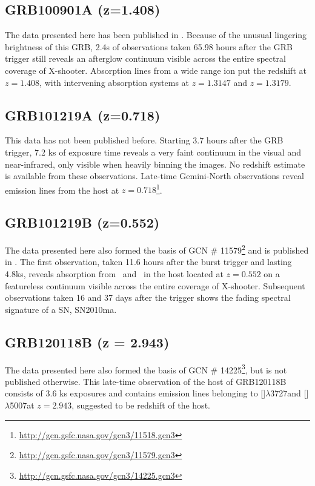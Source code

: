 \documentclass[iop, twocolappendix, numberedappendix, tighten, appendixfloats]{emulateapj}
\newcommand{\oii}{[\ion{O}{2}]$\lambda$3727}
\newcommand{\oiii}{[\ion{O}{3}]$\lambda$5007}
\newcommand{\mgi}{\ion{Mg}{1}}
\newcommand{\mgii}{\ion{Mg}{2}}
\begin{document}
	\subsection{GRB100901A (z=1.408)}
	The data presented here has been published in \citet{Hartoog2013}. Because of
	the unusual lingering brightness of this GRB, 2.4s of observations taken 65.98
	hours after the GRB trigger still reveals an afterglow continuum visible across
	the entire spectral coverage of X-shooter. Absorption lines from a wide range
	ion put the redshift at $z=1.408$, with intervening absorption systems at $z =
	1.3147$ and $z = 1.3179$.

	\subsection{GRB101219A (z=0.718)}
	This data has not been published before. Starting 3.7 hours after the GRB
	trigger, 7.2 ks of exposure time reveals a very faint continuum in the visual
	and near-infrared, only visible when heavily binning the images. No redshift
	estimate is available from these observations.  Late-time Gemini-North
	observations reveal emission lines from the host at
	$z=0.718$\footnote{\url{http://gcn.gsfc.nasa.gov/gcn3/11518.gcn3}}.

	\subsection{GRB101219B (z=0.552)}
	The data presented here also formed the basis of GCN \#
	11579\footnote{\url{http://gcn.gsfc.nasa.gov/gcn3/11579.gcn3}} and is published
	in \citet{Sparre2011}.	The first observation, taken 11.6 hours after the burst
	trigger and lasting 4.8ks, reveals absorption from \mgii~and \mgi~in the host
	located at $z = 0.552$ on a featureless continuum visible across the entire
	coverage of X-shooter.  Subsequent observations taken 16 and 37 days after the
	trigger shows the fading spectral signature of a SN, SN2010ma.

	\subsection{GRB120118B (z = 2.943)}
	The data presented here also formed the basis of GCN \#
	14225\footnote{\url{http://gcn.gsfc.nasa.gov/gcn3/14225.gcn3}}, but is not
	published otherwise. This late-time observation of the host of GRB120118B
	consists of 3.6 ks exposures and contains emission lines belonging to \oii and
	\oiii at $z =	2.943$, suggested to be redshift of the host.
\end{document}
